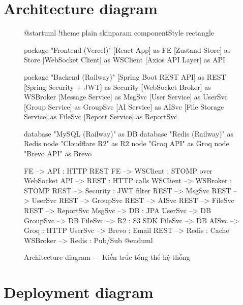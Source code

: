 \documentclass[12pt,a4paper]{report}
\begin{document}
\section{Architecture diagram}

\begin{figure}[H]
    \centering
    \begin{plantuml}
        @startuml
        !theme plain
        skinparam componentStyle rectangle

        package "Frontend (Vercel)" {
            [React App] as FE
            [Zustand Store] as Store
            [WebSocket Client] as WSClient
            [Axios API Layer] as API
        }

        package "Backend (Railway)" {
            [Spring Boot REST API] as REST
            [Spring Security + JWT] as Security
            [WebSocket Broker] as WSBroker
            [Message Service] as MsgSvc
            [User Service] as UserSvc
            [Group Service] as GroupSvc
            [AI Service] as AISvc
            [File Storage Service] as FileSvc
            [Report Service] as ReportSvc
        }

        database "MySQL (Railway)" as DB
        database "Redis (Railway)" as Redis
        node "Cloudflare R2" as R2
        node "Groq API" as Groq
        node "Brevo API" as Brevo

        FE --> API : HTTP REST
        FE --> WSClient : STOMP over WebSocket
        API --> REST : HTTP calls
        WSClient --> WSBroker : STOMP
        REST --> Security : JWT filter
        REST --> MsgSvc
        REST --> UserSvc
        REST --> GroupSvc
        REST --> AISvc
        REST --> FileSvc
        REST --> ReportSvc
        MsgSvc --> DB : JPA
        UserSvc --> DB
        GroupSvc --> DB
        FileSvc --> R2 : S3 SDK
        FileSvc --> DB
        AISvc --> Groq : HTTP
        UserSvc --> Brevo : Email
        REST --> Redis : Cache
        WSBroker --> Redis : Pub/Sub
        @enduml
    \end{plantuml}
    \caption{Architecture diagram --- Kiến trúc tổng thể hệ thống}
\end{figure}

\section{Deployment diagram}
\end{document}

